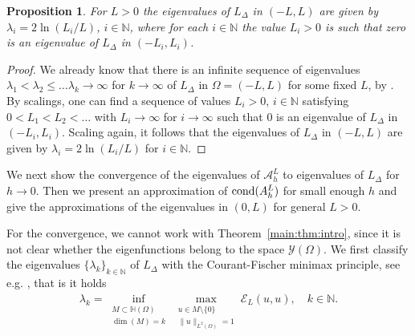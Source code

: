 \documentclass[11 pt]{article}
\newtheorem{proposition}[theorem]{Proposition}
\numberwithin{equation}{section}
\def\N{\mathbb{N}}
\def\mH{\mathbb{H}}
\begin{document}
\begin{proposition}\label{eigenvalue approximation a}
For $L>0$ the eigenvalues of $L_{\Delta}$ in $(-L,L)$ are given by $\lambda_i=2\ln(L_i/L)$, $i\in \N$, where for each $i\in \N$ the value $L_i>0$ is such that zero is an eigenvalue of $L_{\Delta}$ in $(-L_i,L_i)$.
\end{proposition}
\begin{proof}
We already know that there is an infinite sequence of eigenvalues $\lambda_1<\lambda_2\leq\ldots\lambda_k\to \infty$ for $k\to\infty$ of $L_{\Delta}$ in $\Omega=(-L,L)$ for some fixed $L$, by \cite[Theorem 1.4]{CW19}. By scalings, one can find a sequence of values $L_i>0$, $i\in \N$ satisfying $0<L_1<L_2<\ldots$ with $L_i\to\infty$ for $i\to \infty$ such that $0$ is an eigenvalue of $L_{\Delta}$ in $(-L_i,L_i)$. Scaling again, it follows that the eigenvalues of $L_{\Delta}$ in $(-L,L)$ are given by $\lambda_i=2\ln(L_i/L)$ for $i\in \N$.
%
\end{proof}

We next show the convergence of the eigenvalues of $\mathcal{A}^L_h$ to eigenvalues of $L_{\Delta}$ for $h\to 0$. Then we present an approximation of $\textnormal{cond}(A^L_h)$ for small enough $h$ and give the approximations of the eigenvalues in $(0,L)$ for general $L>0$.

For the convergence, we cannot work with Theorem~\ref{main:thm:intro}, since it is not clear whether the eigenfunctions belong to the space $\mathcal{Y} (\Omega)$. We first classify the eigenvalues $\{\lambda_k\}_{k\in \N}$ of $L_{\Delta}$ with the Courant-Fischer minimax principle, see e.g. \cite[Proposition 2.3 and Remark 2.4]{FJW22}, that is it holds
\begin{align}\label{CF}
\lambda_k=\inf_{\substack{M\subset \mH(\Omega)\\ \dim(M)=k}} \max_{\substack{u\in M\setminus\{0\}\\ \|u\|_{L^2(\Omega)}=1}} \mathcal{E}_L(u,u),\quad k\in \N.
\end{align}
\end{document}
